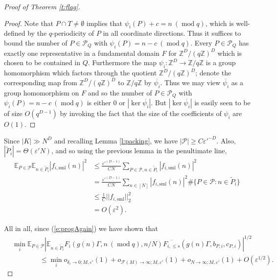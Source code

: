 \documentclass[10pt]{article}
\def\cF{\mathcal{F}}
\def\cP{\mathcal{P}}
\def\eps{\varepsilon}
\def\Z{\mathbb{Z}}
\def\E{\mathbb{E}}
\def\sml{\mathrm{sml}}
\DeclareMathOperator\mo{mod}
\begin{document}
\begin{proof}[Proof of Theorem \ref{t:flag}]
\begin{proof}
Note that $P\cap T \ne \emptyset$ implies that $\psi_i(P)+c = n \ (\mo q)$, which is well-defined by the $q$-periodicity of $P$ in all coordinate directions. Thus it suffices to bound the number of $P\in \cP_Q$ with $\psi_i(P)= n-c \ (\mo q)$. Every $P\in \cP_Q$ has exactly one representative in a fundamental domain $F$ for $\Z^D/(q\Z)^D$ which is chosen to be contained in $Q$. Furthermore the map $\psi_i : \Z^D \to \Z/q\Z$ is a group homomorphism which factors through the quotient $\Z^D/(q\Z)^D$; denote the corresponding map from $\Z^D/(q\Z)^D$ to $\Z/q\Z$ by $\overline{\psi_i}$. Thus we may view $\overline{\psi_i}$ as a group homomorphism on $F$ and so the number of $P\in \cP_Q$ with $\psi_i(P) = n-c \ (\mo q)$ is either 0 or $|\ker \overline{\psi_i}|$. But $|\ker \overline{\psi_i}| $ is easily seen to be of size $O(q^{D-1})$ by invoking the fact that the size of the coefficients of $\psi_i$ are $O(1)$. 
\end{proof}

Since $|K|\gg N^D$ and recalling Lemma \ref{l:packing}, we have $|\cP| \geq C\eps'^{-D}$. Also, $|\tilde P_i| = \Theta(\eps'N)$, and so using the previous lemma in the penultimate line, 
\begin{align*}
\E_{P \in \cP}\E_{n\in \tilde  P_i} | f_{i,\sml}(n)|^2 &\leq \frac{\eps'^{(D-1)}}{CN}\sum_{P\in \cP,n\in \tilde P_i}| f_{i,\sml}(n)|^2 \\
&= \frac{\eps'^{(D-1)}}{CN}\sum_{n \in [N]}| f_{i,\sml}(n)|^2 \#\{P \in \cP: n \in \tilde P_i\} \\
&\leq  \frac{1}{C}|| f_{i,\sml}||_2^2\\
&= O(\eps^2).
\end{align*}

All in all, since (\ref{e:progAgain}) we have shown that  
\begin{align}\label{e:finalBds}
&\min_i \E_{P \in \cP}\left|\E_{n\in \tilde P_i} F_i( g(n) \Gamma, n \ (\mo q), n/N)\overline{F_{i,\leq s}}( g(n) \Gamma, b_{P,i},c_{P,i})\right|^{1/2} \nonumber \\& \qquad \qquad \leq \min_i o_{\delta_i\to 0;M,\eps'}(1) + o_{\cF(M) \to \infty; M,\eps'}(1) + o_{N\to \infty;M,\eps'}(1)  + O(\eps^{1/2}).
\end{align}



\end{proof}
\end{document}
